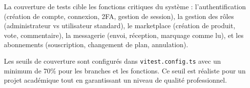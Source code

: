 La couverture de tests cible les fonctions critiques du système : l'authentification (création de compte, connexion, 2FA, gestion de session), la gestion des rôles (administrateur vs utilisateur standard), le marketplace (création de produit, vote, commentaire), la messagerie (envoi, réception, marquage comme lu), et les abonnements (souscription, changement de plan, annulation).



Les seuils de couverture sont configurés dans \texttt{vitest.config.ts} avec un minimum de 70\% pour les branches et les fonctions. Ce seuil est réaliste pour un projet académique tout en garantissant un niveau de qualité professionnel.

